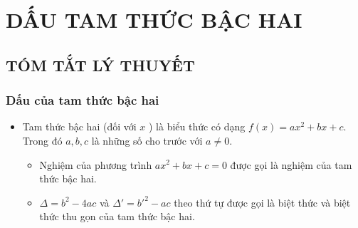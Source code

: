 \section{DẤU TAM THỨC BẬC HAI}
\subsection{TÓM TẮT LÝ THUYẾT}
\subsubsection{Dấu của tam thức bậc hai}
\begin{itemize}
	\item [\iconMT]   Tam thức bậc hai (đối với $x$ ) là biểu thức có dạng $f(x)=ax^2+bx+c$. Trong đó $a, b, c$ là những số cho trước với $a\ne 0$.
	
	
		\begin{itemize}
			\item Nghiệm của phương trình $ax^2+bx+c=0$ được gọi là nghiệm của tam thức bậc hai.
			\item $ \Delta =b^2-4ac$ và $ \Delta '=b'^2-ac$ theo thứ tự được gọi là biệt thức và biệt thức thu gọn của tam thức bậc hai.
		\end{itemize}
	

\end{itemize}
